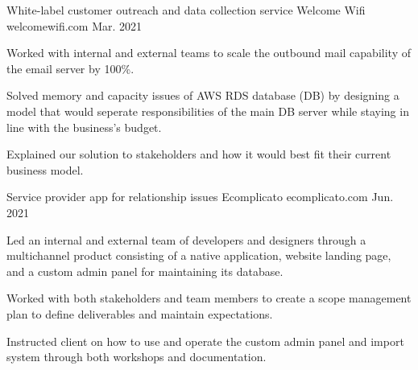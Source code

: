 

\begin{cventries}

  \cventry
    {White-label customer outreach and data collection service  } %
    {Welcome Wifi} %
    {welcomewifi.com} %
    {Mar. 2021} %
    {
      \begin{cvitems} %
        \item {Worked with internal and external teams to scale the outbound mail capability of the email server by 100\%.}
        \item {Solved memory and capacity issues of AWS RDS database (DB) by designing a model that would seperate responsibilities of the main DB server while staying in line with the business's budget.}
        \item {Explained our solution to stakeholders and how it would best fit their current business model. }
      \end{cvitems}
    }

  \cventry
    {Service provider app for relationship issues} %
    {Ecomplicato} %
    {ecomplicato.com} %
    {Jun. 2021} %
    {
      \begin{cvitems} %
        \item {Led an internal and external team of developers and designers through a multichannel product consisting of a native application, website landing page, and a custom admin panel for maintaining its database.}
        \item {Worked with both stakeholders and team members to create a scope management plan to define deliverables and maintain expectations.}
        \item {Instructed client on how to use and operate the custom admin panel and import system through both workshops and documentation. }
      \end{cvitems}
    }




\end{cventries}
